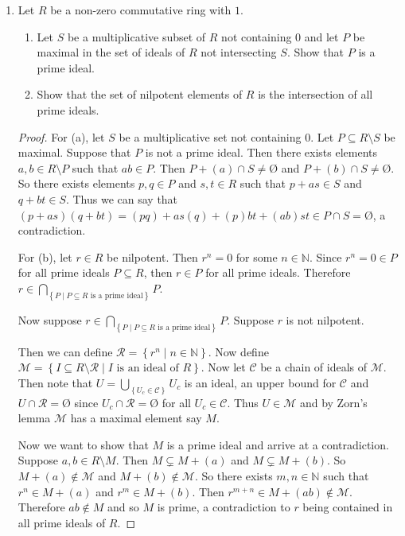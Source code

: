 \documentclass{article}
\theoremstyle{definition}
\newcommand{\N}{\mathbb{N}}
\newcommand{\set}[1]{\left\{#1\right\}}
\newcommand{\es}{\text{\O}}
\begin{document}
\begin{enumerate}
            \item Let $R$ be a non-zero commutative ring with $1$. 
                
                \begin{enumerate}
                    \item Let $S$ be a multiplicative subset of $R$ not containing $0$ and let $P$ be maximal in the set of ideals of $R$ not intersecting $S$. Show that $P$ is a prime ideal.
                    \item Show that the set of nilpotent elements of $R$ is the intersection of all prime ideals.
                \end{enumerate}
            
            \begin{proof}
                For (a), let $S$ be a multiplicative set not containing $0$. Let $P\subseteq R\setminus S$ be maximal. Suppose that $P$ is not a prime ideal. Then there exists elements $a,b\in R\setminus P$ such that $ab\in P$. Then $P+(a)\cap S \neq \es$ and $P+(b)\cap S \neq \es$. So there exists elements $p,q\in P$ and $s,t\in R$ such that $p+as\in S$ and $q+bt\in S$. Thus we can say that $(p+as)(q+bt)=(pq)+as(q)+(p)bt+(ab)st\in P\cap S=\es $, a contradiction.

                For (b), let $r\in R$ be nilpotent. Then $r^n=0$ for some $n\in \N$. Since $r^n=0\in P$ for all prime ideals $P\subseteq R$, then $r\in P$ for all prime ideals. Therefore $r\in \bigcap_{\set{P\mid P\subseteq R \text{ is a prime ideal}}}P$.

                Now suppose $r\in \bigcap_{\set{P\mid P\subseteq R \text{ is a prime ideal}}} P$. Suppose $r$ is not nilpotent. 
                
                Then we can define $\mathcal{R}=\set{r^n\mid n\in \N}$. Now define $\mathcal{M}=\set{I\subseteq R\setminus \mathcal{R}\mid I \text{ is an ideal of } R}$. Now let $\mathcal{C}$ be a chain of ideals of $\mathcal{M}$. Then note that $U=\bigcup_{\set{U_c\in \mathcal{C}}}U_c$ is an ideal, an upper bound for $\mathcal{C}$ and $U\cap \mathcal{R}=\es$ since $U_c\cap \mathcal{R}=\es$ for all $U_c\in \mathcal{C}$. Thus $U\in \mathcal{M}$ and by Zorn's lemma $\mathcal{M}$ has a maximal element say $M$. 
                
                Now we want to show that $M$ is a prime ideal and arrive at a contradiction. Suppose $a,b\in R\setminus M$. Then $M\subsetneq M+(a)$ and $M\subsetneq M+(b)$. So $M+(a)\notin \mathcal{M}$ and $M+(b)\notin \mathcal{M}$. So there exists $m,n\in \N$ such that $r^n\in M+(a)$ and $r^m\in M+(b)$. Then $r^{m+n}\in M+(ab)\notin \mathcal{M}$. Therefore $ab\notin M$ and so $M$ is prime, a contradiction to $r$ being contained in all prime ideals of $R$. 


\end{proof}
\end{enumerate}
\end{document}
